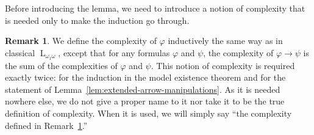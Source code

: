 \documentclass{amsart}
\theoremstyle{definition}
\newtheorem{remark}[theorem]{Remark}
\numberwithin{equation}{theorem}
\renewcommand{\phi}{\varphi}
\newcommand{\narrow}[1]{\xrightarrow{#1}}
\renewcommand{\to}{\narrow{}}
\newcommand{\baselang}{\operatorname{L}}
\newcommand{\lang}{\baselang_{\omega_1\omega}}
\begin{document}
Before introducing the lemma, we need to introduce a notion of complexity that is needed only to make the induction go through.
\begin{remark}\label{rem:complexity}
  We define the complexity of $\phi$ inductively the same way as in classical $\lang$, except that for any formulas $\phi$ and $\psi$, the complexity of $\phi\to\psi$ is the sum of the complexities of $\phi$ and $\psi$.
  This notion of complexity is required exactly twice: for the induction in the model existence theorem and for the statement of Lemma~\ref{lem:extended-arrow-manipulations}.
  As it is needed nowhere else, we do not give a proper name to it nor take it to be the true definition of complexity.
  When it is used, we will simply say ``the complexity defined in Remark~\ref{rem:complexity}.''
\end{remark}
\end{document}
